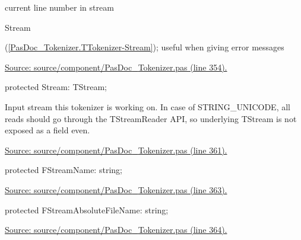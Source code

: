 \documentclass{report}
\newif\ifpdf
\begin{document}
\begin{list}{}
\begin{flushleft}
\ifpdf
\end{flushleft}
\fi


\par current line number in stream \begin{ttfamily}Stream\end{ttfamily}(\ref{PasDoc_Tokenizer.TTokenizer-Stream}); useful when giving error messages\par
\href{https://github.com/pasdoc/pasdoc/blob/master/source/component/PasDoc_Tokenizer.pas#L354}{Source: source/component/PasDoc{\_}Tokenizer.pas (line 354).}\label{PasDoc_Tokenizer.TTokenizer-Stream}
\item[\textbf{Stream}\hfill]
\ifpdf
\begin{flushleft}
\fi
\begin{ttfamily}
protected Stream: TStream;\end{ttfamily}

\ifpdf
\end{flushleft}
\fi


\par Input stream this tokenizer is working on. In case of STRING{\_}UNICODE, all reads should go through the TStreamReader API, so underlying TStream is not exposed as a field even.\par
\href{https://github.com/pasdoc/pasdoc/blob/master/source/component/PasDoc_Tokenizer.pas#L361}{Source: source/component/PasDoc{\_}Tokenizer.pas (line 361).}\label{PasDoc_Tokenizer.TTokenizer-FStreamName}
\item[\textbf{FStreamName}\hfill]
\ifpdf
\begin{flushleft}
\fi
\begin{ttfamily}
protected FStreamName: string;\end{ttfamily}

\ifpdf
\end{flushleft}
\fi


\par  \par
\href{https://github.com/pasdoc/pasdoc/blob/master/source/component/PasDoc_Tokenizer.pas#L363}{Source: source/component/PasDoc{\_}Tokenizer.pas (line 363).}\label{PasDoc_Tokenizer.TTokenizer-FStreamAbsoluteFileName}
\item[\textbf{FStreamAbsoluteFileName}\hfill]
\ifpdf
\begin{flushleft}
\fi
\begin{ttfamily}
protected FStreamAbsoluteFileName: string;\end{ttfamily}

\ifpdf
\end{flushleft}
\fi


\par  \par
\href{https://github.com/pasdoc/pasdoc/blob/master/source/component/PasDoc_Tokenizer.pas#L364}{Source: source/component/PasDoc{\_}Tokenizer.pas (line 364).}\end{list}
\end{document}
